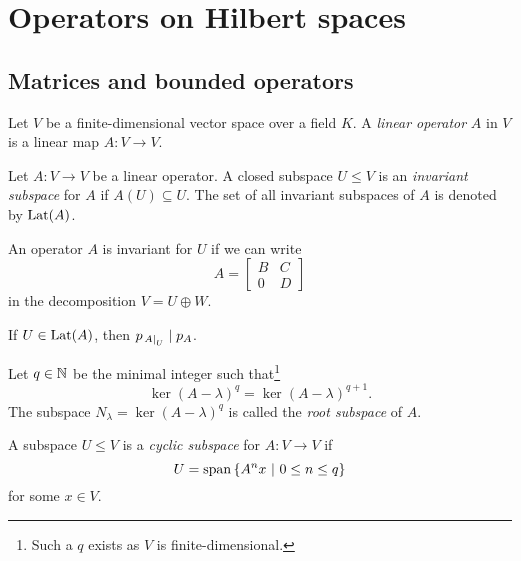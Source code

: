 \section{Operators on Hilbert spaces}

\subsection{Matrices and bounded operators}


\begin{definicija}
Let $V$ be a finite-dimensional vector space over a field $K$. A
\emph{linear operator} $A$ in $V$ is a
linear map $A \colon V \to V$.
\end{definicija}

\begin{definicija}
Let $A \colon V \to V$ be a linear operator. A closed subspace
$U \leq V$ is an
\emph{invariant subspace} for $A$ if
$A(U) \subseteq U$. The set of all invariant subspaces of $A$ is
denoted by $\operatorname{Lat}(A)$.
\end{definicija}

\begin{opomba}
An operator $A$ is invariant for $U$ if we can write
\[
A =
\begin{bmatrix}
B & C \\
0 & D
\end{bmatrix}
\]
in the decomposition $V = U \oplus W$.
\end{opomba}

\begin{opomba}
If $U \in \operatorname{Lat}(A)$, then $p_{\left. A\right|_{U}^{}} \mid p_A$.
\end{opomba}

\begin{definicija}
Let $q \in \mathbb{N}$ be the minimal integer such that\footnote{Such a $q$
exists as $V$ is finite-dimensional.}
\[
\ker (A - \lambda)^q = \ker (A - \lambda)^{q+1}.
\]
The subspace
$N_\lambda = \ker (A - \lambda)^q$ is called the
\emph{root subspace} of $A$.
\end{definicija}

\begin{definicija}
A subspace $U \leq V$ is a
\emph{cyclic subspace} for
$A \colon V \to V$ if
\[
U = \operatorname{span} \left\{A^n x~\middle\vert~0 \leq n \leq q\right\}
\]
for some $x \in V$.
\end{definicija}

